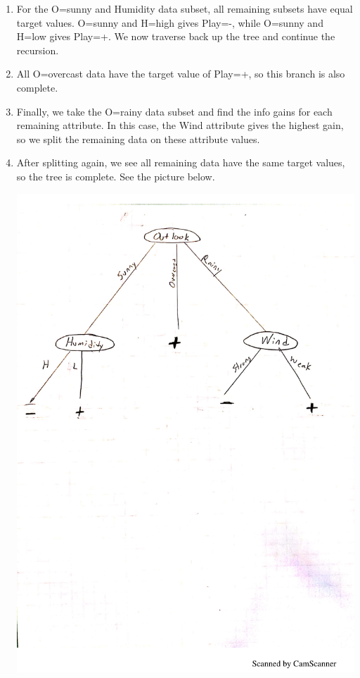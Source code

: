 \documentclass[12pt, fullpage,letterpaper]{article}
\begin{document}
\begin{enumerate}
\begin{enumerate}
\begin{enumerate}
		\item For the O=sunny and Humidity data subset, all remaining subsets have equal target values. O=sunny and H=high gives Play=-, while O=sunny and H=low gives Play=+. We now traverse back up the tree and continue the recursion. 
		
		\item All O=overcast data have the target value of Play=+, so this branch is also complete.
		
		\item Finally, we take the O=rainy data subset and find the info gains for each remaining attribute. In this case, the Wind attribute gives the highest gain, so we split the remaining data on these attribute values.
		
		\item After splitting again, we see all remaining data have the same target values, so the tree is complete. See the picture below.
		
\includegraphics[]{tree_me.pdf}
			

\end{enumerate}
\end{enumerate}
\end{enumerate}
\end{document}
